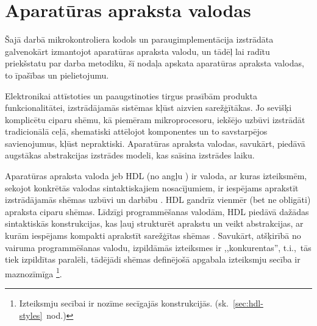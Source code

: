 



\section{Aparatūras apraksta valodas}
Šajā darbā mikrokontroliera kodols un paraugimplementācija izstrādāta
galvenokārt izmantojot aparatūras apraksta valodu, un tādēļ lai radītu
priekšstatu par darba metodiku, šī nodaļa apskata 
aparatūras apraksta valodas, to īpašības un pielietojumu.

Elektronikai attīstoties un paaugstinoties tirgus prasībām produkta funkcionalitātei,
izstrādājamās sistēmas kļūst aizvien sarežģītākas. Jo sevišķi komplicētu ciparu shēmu, 
kā piemēram mikroprocesoru, iekšējo uzbūvi izstrādāt tradicionālā ceļā,
shematiski attēlojot komponentes un to savstarpējos savienojumus, kļūst
nepraktiski. Aparatūras apraksta valodas, savukārt, piedāvā augstākas
abstrakcijas izstrādes modeli, kas saīsina izstrādes laiku.

Aparatūras apraksta valoda jeb HDL
(no angļu )
ir valoda, ar kuras izteiksmēm, sekojot konkrētās 
valodas sintaktiskajiem nosa\-cī\-jumiem, ir iespējams aprakstīt
izstrādājamās shēmas uzbūvi un darbību \cite{HDL}. %
HDL gandrīz vienmēr (bet ne obligāti) apraksta ciparu shēmas.
Līdzīgi program\-mē\-šanas valodām, HDL piedāvā dažādas sintaktiskās 
konstrukcijas, kas ļauj strukturēt aprakstu un veikt abstrakcijas,
ar kurām iespējams kompakti aprakstīt sarežģītas shēmas
\cite[1.~lpp.]{Perry-VHDL}.
Savukārt, atšķirībā no vairuma programmēšanas valodu,
izpildāmās izteiksmes ir ,,konkurentas'', t.i.,~tās tiek izpildītas paralēli, 
tādējādi shēmas definējošā apgabala izteiksmju secība ir maznozīmīga%
\footnote{Izteiksmju secībai ir nozīme secīgajās konstrukcijās.
	(sk.~\ref{sec:hdl-styles}~nod.)}.

